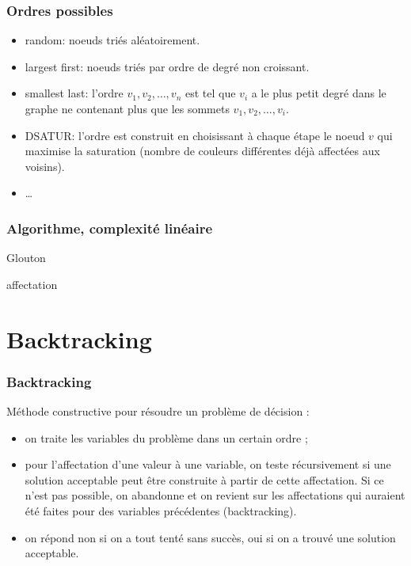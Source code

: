 \documentclass{beamer}
\begin{document}
\begin{frame}
  \frametitle{Ordres possibles}

  \begin{itemize}
  \item random: noeuds triés aléatoirement. 
  \item largest first: noeuds triés par ordre de degré non croissant.
  \item smallest last: l'ordre $v_1,v_2,\dots,v_n$ est tel
    que $v_i$ a le plus petit degré dans le graphe
    ne contenant plus que les sommets $v_1,v_2,\dots,v_i$.
  \item DSATUR: l'ordre est construit en choisissant à chaque étape
    le noeud $v$ qui maximise la saturation (nombre de couleurs différentes
    déjà affectées aux voisins).
  \item \dots
  \end{itemize}
  
\end{frame}

\begin{frame}
  \frametitle{Algorithme, complexité linéaire}

 \begin{algorithm}[H]
  \caption{Glouton}
  \label{alg:glouton}
  \Return affectation
 \end{algorithm}
  
\end{frame}

\section{Backtracking}

\begin{frame}
  \frametitle{Backtracking}

  Méthode constructive pour résoudre un problème de décision :
  \begin{itemize}
  \item on traite les variables du problème dans un certain ordre ;
  \item pour l'affectation d'une valeur à une variable, on teste récursivement si une solution acceptable peut être construite à partir de cette affectation. Si ce n'est pas possible, on abandonne et on revient sur les affectations qui auraient été faites pour des variables précédentes (backtracking).
  \item on répond non si on a tout tenté sans succès, oui si on a trouvé une solution acceptable. 
  \end{itemize}
  
\end{frame}
\end{document}
